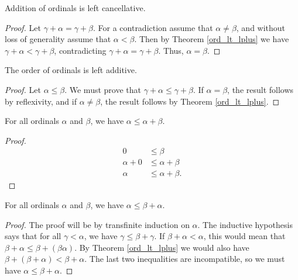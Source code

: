 \documentclass[../../math.tex]{subfiles}
\begin{document}
\begin{instance} \label{ord_plus_lcancel}
    Addition of ordinals is left cancellative.
\end{instance}
\begin{proof}
    Let $\gamma + \alpha = \gamma + \beta$.  For a contradiction assume that
    $\alpha \neq \beta$, and without loss of generality assume that $\alpha <
    \beta$.  Then by Theorem \ref{ord_lt_lplus} we have $\gamma + \alpha <
    \gamma + \beta$, contradicting $\gamma + \alpha = \gamma + \beta$.  Thus,
    $\alpha = \beta$.
\end{proof}

\begin{instance}
    The order of ordinals is left additive.
\end{instance}
\begin{proof}
    Let $\alpha \leq \beta$.  We must prove that $\gamma + \alpha \leq \gamma +
    \beta$.  If $\alpha = \beta$, the result follows by reflexivity, and if
    $\alpha \neq \beta$, the result follows by Theorem \ref{ord_lt_lplus}.
\end{proof}

\begin{theorem} \label{ord_le_self_rplus}
    For all ordinals $\alpha$ and $\beta$, we have $\alpha \leq \alpha + \beta$.
\end{theorem}
\begin{proof}
    \begin{align*}
        0 & \leq \beta \\
        \alpha + 0 &\leq \alpha + \beta \\
        \alpha &\leq \alpha + \beta.
    \end{align*}
\end{proof}

\begin{theorem} \label{ord_le_self_lplus}
    For all ordinals $\alpha$ and $\beta$, we have $\alpha \leq \beta + \alpha$.
\end{theorem}
\begin{proof}
    The proof will be by transfinite induction on $\alpha$.  The inductive
    hypothesis says that for all $\gamma < \alpha$, we have $\gamma \leq \beta +
    \gamma$.  If $\beta + \alpha < \alpha$, this would mean that $\beta + \alpha
    \leq \beta + (\beta \alpha)$.  By Theorem \ref{ord_lt_lplus} we would also
    have $\beta + (\beta + \alpha) < \beta + \alpha$.  The last two inequalities
    are incompatible, so we must have $\alpha \leq \beta + \alpha$.
\end{proof}
\end{document}
